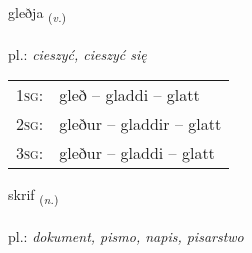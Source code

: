 \documentclass[frontgrid, backgrid]{flacards}\usepackage[]{graphicx}\usepackage[]{xcolor}
\begin{document}
\renewcommand{\blhead}{\vskip5pt {\small\bfseries\footnotesize Sagnorð | Verb }}
\renewcommand{\bcfoot}{\vskip5pt \hspace{2pt}{\small\bfseries\footnotesize 2K}}


{gleðja \small{\textsubscript{(\textit{v.})}} \\[1ex] %
\textphonetic{[klɛðja]} \\
pl.: \emph{cieszyć, cieszyć się} \\  [2ex]
\renewcommand*{\arraystretch}{0.8}
\begin{tabular}{p{1cm}l}
\textsc{1sg}: & gleð -- gladdi -- glatt \\ 
\textsc{2sg}: & gleður -- gladdir -- glatt \\ 
\textsc{3sg}: & gleður -- gladdi -- glatt \\ 
\end{tabular}
}

\renewcommand{\flhead}{\vskip5pt \fboxsep=0pt {\small\bfseries\footnotesize Nafnorð | Noun}}
\renewcommand{\fcfoot}{\vskip5pt \fboxsep=0pt \hspace{2pt}{\small\bfseries\footnotesize 2K}}

\renewcommand{\blhead}{\vskip5pt {\small\bfseries\footnotesize Nafnorð | Noun }}
\renewcommand{\bcfoot}{\vskip5pt \hspace{2pt}{\small\bfseries\footnotesize 2K}}


{skrif \small{\textsubscript{(\textit{n.})}} \\[1ex] %
\textphonetic{[skrɪːv]} \\
pl.: \emph{dokument, pismo, napis, pisarstwo} \\  [2ex]
\renewcommand*{\arraystretch}{0.8}
}

\renewcommand{\flhead}{\vskip5pt \fboxsep=0pt {\small\bfseries\footnotesize Sagnorð | Verb}}
\renewcommand{\fcfoot}{\vskip5pt \fboxsep=0pt \hspace{2pt}{\small\bfseries\footnotesize 2K}}
\end{document}
